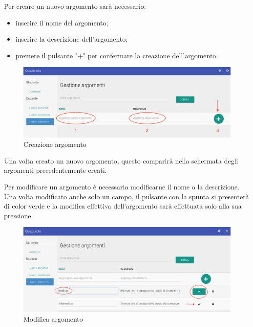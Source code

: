\documentclass[12pt,a4paper]{article}
\begin{document}

		\par Per creare un nuovo argomento sarà necessario:
		\begin{itemize}
			\item inserire il nome del argomento;
			\item inserire la descrizione dell'argomento;
			\item premere il pulsante "+" per confermare la creazione dell'argomento.
		\end{itemize}
		
			\begin{figure}[H]	
				\centering
				\includegraphics[width=1.0\linewidth]{../img/screenshot/aggiungiArgomento.png}
				\caption{Creazione argomento}
				\label{Creazione argomento}
			\end{figure}
		
		Una volta creato un nuovo argomento, questo comparirà nella schermata degli argomenti precedentemente creati.
		
		\par Per modificare un argomento è necessario modificarne il nome o la descrizione. Una volta modificato anche solo un campo, il pulsante con la spunta si presenterà di color verde e la modifica effettiva dell'argomento sarà effettuata solo alla sua pressione. \\
		
			\begin{figure}[H]	
				\centering
				\includegraphics[width=1.0\linewidth]{../img/screenshot/modificaArgomento.png}
				\caption{Modifica argomento}
				\label{Modifica argomento}
			\end{figure}
		
\end{document}
